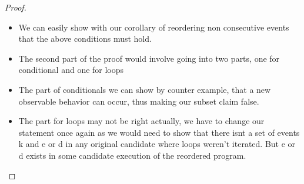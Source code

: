 
    \begin{proof}
        \begin{itemize}
            \item We can easily show with our corollary of reordering non consecutive events that the above conditions must hold. 
            \item The second part of the proof would involve going into two parts, one for conditional and one for loops
            \item The part of conditionals we can show by counter example, that a new observable behavior can occur, thus making our subset claim false. 
            \item The part for loops may not be right actually, we have to change our statement once again as we would need to show that there isnt a set of events k and e or d in any original candidate where loops weren't iterated. But e or d exists in some candidate execution of the reordered program. 
        \end{itemize}
    \end{proof}